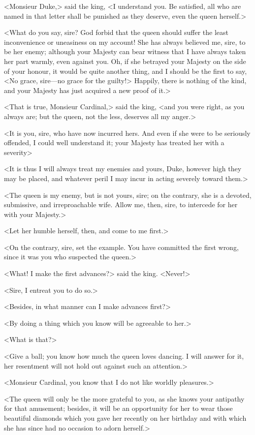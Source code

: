 <Monsieur Duke,> said the king, <I understand you. Be satisfied, all who are named in that letter shall be punished as they deserve, even the queen herself.> 

<What do you say, sire? God forbid that the queen should suffer the least inconvenience or uneasiness on my account! She has always believed me, sire, to be her enemy; although your Majesty can bear witness that I have always taken her part warmly, even against you. Oh, if she betrayed your Majesty on the side of your honour, it would be quite another thing, and I should be the first to say, <No grace, sire—no grace for the guilty!> Happily, there is nothing of the kind, and your Majesty has just acquired a new proof of it.> 

<That is true, Monsieur Cardinal,> said the king, <and you were right, as you always are; but the queen, not the less, deserves all my anger.> 

<It is you, sire, who have now incurred hers. And even if she were to be seriously offended, I could well understand it; your Majesty has treated her with a severity\longdash> 

<It is thus I will always treat my enemies and yours, Duke, however high they may be placed, and whatever peril I may incur in acting severely toward them.> 

<The queen is my enemy, but is not yours, sire; on the contrary, she is a devoted, submissive, and irreproachable wife. Allow me, then, sire, to intercede for her with your Majesty.> 

<Let her humble herself, then, and come to me first.> 

<On the contrary, sire, set the example. You have committed the first wrong, since it was you who suspected the queen.> 

<What! I make the first advances?> said the king. <Never!> 

<Sire, I entreat you to do so.> 

<Besides, in what manner can I make advances first?> 

<By doing a thing which you know will be agreeable to her.> 

<What is that?> 

<Give a ball; you know how much the queen loves dancing. I will answer for it, her resentment will not hold out against such an attention.> 

<Monsieur Cardinal, you know that I do not like worldly pleasures.> 

<The queen will only be the more grateful to you, as she knows your antipathy for that amusement; besides, it will be an opportunity for her to wear those beautiful diamonds which you gave her recently on her birthday and with which she has since had no occasion to adorn herself.> 

